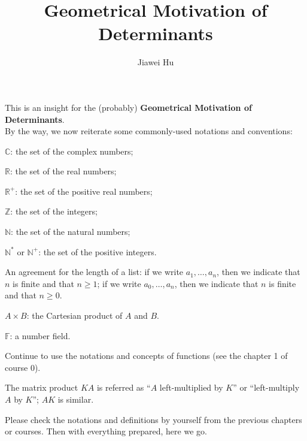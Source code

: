 \documentclass{article}
\title{\LARGE \textbf{Geometrical Motivation of Determinants}}
\author{\large Jiawei Hu}
\begin{document}
\maketitle

This is an insight for the (probably) \textbf{Geometrical Motivation of Determinants}. \\ 
By the way, we now reiterate some commonly-used notations and conventions:
\begin{compactenum}
    \item $\mathbb{C}$: the set of the complex numbers;
    \item $\mathbb{R}$: the set of the real numbers;
    \item $\mathbb{R}^+$: the set of the positive real numbers;
    \item $\mathbb{Z}$: the set of the integers;
    \item $\mathbb{N}$: the set of the natural numbers;
    \item $\mathbb{N^\ast}$ or $\mathbb{N}^+$: the set of the positive integers.
    \item An agreement for the length of a list: if we write $a_1, \dots, a_n$, then we indicate that $n$ is finite and that $n\geq 1$; if we write $a_0, \dots, a_n$, then we indicate that $n$ is finite and that $n\geq 0$.
    \item $A\times B$: the Cartesian product of $A$ and $B$.
    \item $\mathbb{F}$: a number field.
    \item Continue to use the notations and concepts of functions (see the chapter 1 of course 0).
    \item The matrix product $KA$ is referred as ``$A$ left-multiplied by $K$'' or ``left-multiply $A$ by $K$''; $AK$ is similar.
\end{compactenum} 
Please check the notations and definitions by yourself from the previous chapters or courses. Then with everything prepared, here we go.
\end{document}
